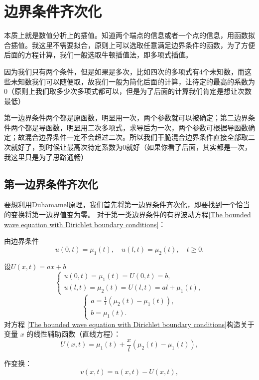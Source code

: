 \documentclass[12pt,a4paper]{article}
\numberwithin{subsection}{section}
\numberwithin{subsubsection}{subsection}
\theoremstyle{plain}
\theoremstyle{definition}
\theoremstyle{remark}
\begin{document}
		\section{边界条件齐次化}
		本质上就是数值分析上的插值。知道两个端点的信息或者一个点的信息，用函数拟合插值。我这里不需要拟合，原则上可以选取任意满足边界条件的函数，为了方便后面的方程计算，我们一般选取牛顿插值法，即多项式插值。	
		
		因为我们只有两个条件，但是如果是多次，比如四次的多项式有4个未知数，而这些未知数我们可以随便取，故我们一般为简化后面的计算，让待定的最高的系数为0（原则上我们取多少次多项式都可以，但是为了后面的计算我们肯定是想让次数最低）
		
		第一边界条件两个都是原函数，明显用一次，两个参数就可以被确定；第二边界条件两个都是导函数，明显用二次多项式，求导后为一次，两个参数可根据导函数确定；故混合边界条件一定不会超过二次。所以我们干脆混合边界条件直接全部取二次就好了，到时候让最高次待定系数为0就好（如果你看了后面，其实都是一次，我这里只是为了思路通畅）
	\subsection{第一边界条件齐次化}
	要想利用Duhamamel原理，我们首先将第一边界条件齐次化，即要找到一个恰当的变换将第一边界值变为零。
	对于第一类边界条件的有界波动方程\eqref{The bounded wave equation with Dirichlet boundary conditions}：
	
	由边界条件
	\begin{equation}
		u(0,t) = \mu_1(t), \quad u(l,t) = \mu_2(t), \quad t \geq 0.
	\end{equation}
	
	设$U(x, t)=ax+b$
	\[
	\begin{cases}
		u(0, t) = \mu_1(t) = U(0, t) = b, \\
		u(l, t) = \mu_2(t) = U(l, t) = al + \mu_1(t),
	\end{cases}
	\]
	\[
	\begin{cases}
		a = \frac{1}{l}(\mu_2(t) - \mu_1(t)), \\
		b = \mu_1(t).
	\end{cases}
	\]
	对方程 \eqref{The bounded wave equation with Dirichlet boundary conditions}构造关于变量 \(x\) 的线性辅助函数（直线方程）：
	\begin{equation}
		U(x, t) = \mu_1(t) + \frac{x}{l}(\mu_2(t) - \mu_1(t)),
	\end{equation}
	
	作变换：
	\begin{equation}
		v(x, t) = u(x, t) - U(x, t),
	\end{equation}
	
\end{document}
